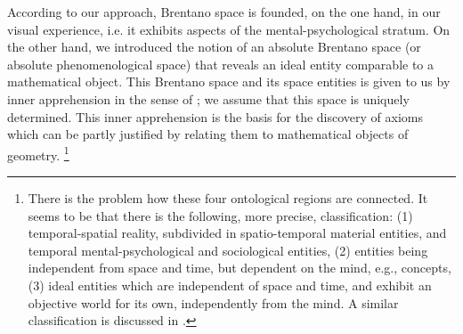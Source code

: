 \documentclass{ao2e}
\begin{document}
According to our approach, Brentano space is founded, on the one hand, in our visual experience, i.e. it exhibits aspects of the mental-psychological stratum. On the other hand, we introduced the notion of an absolute Brentano space (or absolute phenomenological space) that reveals
 an ideal entity comparable to a mathematical object.
This Brentano space and its space entities is given to us by inner apprehension in the sense of 
\cite{kant-i-1998-a}; we assume that this space is uniquely determined. This inner apprehension is the basis for the discovery of axioms which can be partly justified by relating them to mathematical  objects of geometry.
\footnote{There is the problem how these four ontological regions are connected. It seems to be that there is the following, more precise, classification: (1) temporal-spatial reality, subdivided in 
spatio-temporal material entities, and temporal mental-psychological and sociological entities,
(2) entities being independent from space and time, but dependent on the mind, e.g., concepts, (3) ideal entities
which are independent of space and time, and exhibit an objective world for its own, independently from the mind.
A similar classification is discussed in \cite{ingarden-r-1966-a}.}
\end{document}
